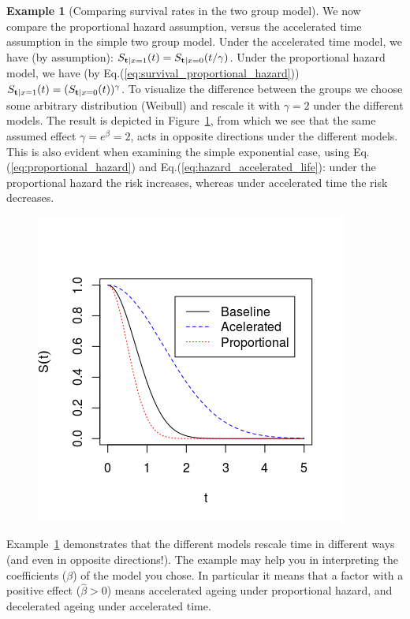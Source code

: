 \documentclass[12pt,a4paper]{report}
\theoremstyle{plain}
\theoremstyle{definition}
\newtheorem{example}{Example}
\begin{document}
\begin{example}[Comparing survival rates in the two group model]
\label{eg:two_groups_two_time_scalings}
We now compare the proportional hazard assumption, versus the accelerated time assumption in the simple two group model. 
Under the accelerated time model, we have (by assumption):
$S_{\mathbf{t}|x=1} (t) = S_{\mathbf{t}|x = 0} (t/\gamma)$. 
Under the proportional hazard model, we have (by Eq.(\ref{eq:survival_proportional_hazard})) 
$	S_{\mathbf{t}|x=1} (t)=(S_{\mathbf{t}|x=0} (t))^{\gamma}$.
To visualize the difference between the groups we choose some arbitrary distribution (Weibull) and rescale it with $\gamma=2$ under the different models. 
The result is depicted in Figure~\ref{fig:time_rescaling}, from which we see that the same assumed effect $\gamma=e^\beta=2$, acts in opposite directions under the different models. 
This is also evident when examining the simple exponential case, using Eq.(\ref{eq:proportional_hazard}) and Eq.(\ref{eq:hazard_accelerated_life}): under the proportional hazard the risk increases, whereas under accelerated time the risk decreases.

\begin{figure}[ht]
\centering
\includegraphics[height=0.3\textheight]{art/survivals}
\caption{}
\label{fig:time_rescaling}
\end{figure}
\end{example}
Example~\ref{eg:two_groups_two_time_scalings}  demonstrates that the different models rescale time in different ways (and even in opposite directions!). 
The example may help you in interpreting the coefficients ($\beta$) of the model you chose. 
In particular it means that a factor with a positive effect ($\hat{\beta}>0$) means accelerated ageing under proportional hazard, and decelerated ageing under accelerated time.
\end{document}
